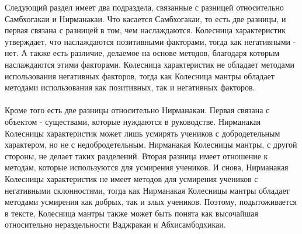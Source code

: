 Следующий раздел имеет два подраздела, связанные с разницей относительно
Самбхогакаи и Нирманакаи. Что касается Самбхогакаи, то есть две разницы, и первая
связана с разницей в том, чем наслаждаются. Колесница характеристик утверждает, что
наслаждаются позитивными факторами, тогда как негативными - нет. А также есть различие,
делаемое на основе методов, благодаря которым наслаждаются этими факторами. Колесница
характеристик не обладает методами использования негативных факторов, тогда как
Колесница мантры обладает методами использования как позитивных, так и негативных
факторов.\\
\\
Кроме того есть две разницы относительно Нирманакаи. Первая связана с объектом -
существами, которые нуждаются в руководстве. Нирманакая Колесницы характеристик
может лишь усмирять учеников с добродетельным характером, но не с недобродетельным.
Нирманакая Колесницы мантры, с другой стороны, не делает таких разделений. Вторая
разница имеет отношение к методам, которые используются для усмирения учеников. И
снова, Нирманакая Колесницы характеристик не имеет методов для усмирения учеников с
негативными склонностями, тогда как Нирманакая Колесницы мантры обладает методами
усмирения как добрых, так и злых учеников. Поэтому, подытоживается в тексте, Колесница
мантры также может быть понята как высочайшая относительно нераздельности Ваджракаи
и Абхисамбодхикаи.\\

